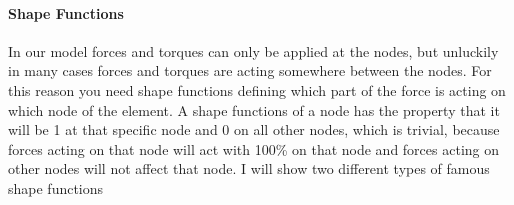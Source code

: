   \paragraph{Shape Functions} In our model forces and torques can only be applied at the nodes, but unluckily in many cases forces and torques are acting somewhere between the nodes. For this reason you need shape functions defining which part of the force is acting on which node of the element. A shape functions of a node has the property that it will be 1 at that specific node and 0 on all other nodes, which is trivial, because forces acting on that node will act with 100\% on that node and forces acting on other nodes will not affect that node. I will show two different types of famous shape functions